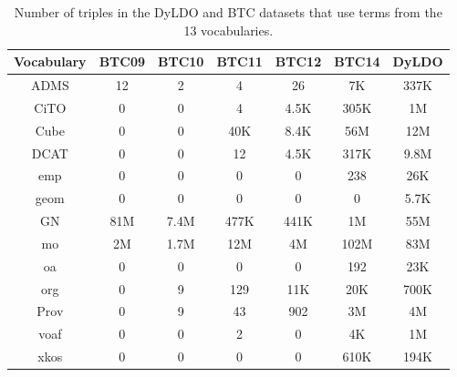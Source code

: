 \begin{table}
	\small
	\caption{Number of triples in the DyLDO and BTC datasets that use terms from the 13 vocabularies.}
	\label{table:table8}	
	\begin{tabular}{ccccccc}
		\toprule
		Vocabulary & BTC09 & BTC10 & BTC11 & BTC12 & BTC14 & DyLDO\\
		\midrule 
		ADMS & 12 & 2 & 4 & 26 & 7K & 337K
		\\
		
		CiTO & 0 & 0 & 4 & 4.5K & 305K& 1M
		\\
		
		Cube & 0 & 0 & 40K & 8.4K & 56M & 12M
		\\
		
		DCAT & 0 & 0 & 12 & 4.5K & 317K & 9.8M
		\\
		
		emp & 0 & 0 & 0 & 0 & 238 & 26K
		\\
		
		geom & 0 & 0 & 0 & 0 & 0 & 5.7K
		\\
		
		GN & 81M & 7.4M & 477K & 441K & 1M& 55M
		\\
		
		mo & 2M & 1.7M & 12M & 4M & 102M& 83M
		\\
		
		oa & 0 & 0 & 0 & 0 & 192& 23K
		\\
		
		org & 0 & 9 & 129 & 11K & 20K& 700K
		\\
		
		Prov & 0 & 9 & 43 & 902 & 3M& 4M
		\\
		
		voaf & 0 & 0 & 2 & 0 & 4K& 1M
		\\
		
		xkos & 0 & 0 & 0 & 0 & 610K & 194K
		\\
		\bottomrule
	\end{tabular}
\end{table}


